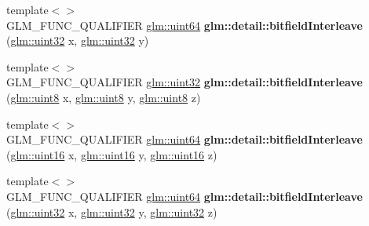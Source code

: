 \begin{DoxyCompactItemize}
\item 
\mbox{\label{bitfield_8inl_a7f40bc91b3d293fae0f7df8de85cdcc6}} 
{\footnotesize template$<$$>$ }\\G\+L\+M\+\_\+\+F\+U\+N\+C\+\_\+\+Q\+U\+A\+L\+I\+F\+I\+ER \hyperlink{group__gtc__type__precision_gae3632bf9b37da66233d78930dd06378a}{glm\+::uint64} {\bfseries glm\+::detail\+::bitfield\+Interleave} (\hyperlink{group__gtc__type__precision_ga202b6a53c105fcb7e531f9b443518451}{glm\+::uint32} x, \hyperlink{group__gtc__type__precision_ga202b6a53c105fcb7e531f9b443518451}{glm\+::uint32} y)
\item 
\mbox{\label{bitfield_8inl_a27e9c62ce3ad180236573daec6a6461f}} 
{\footnotesize template$<$$>$ }\\G\+L\+M\+\_\+\+F\+U\+N\+C\+\_\+\+Q\+U\+A\+L\+I\+F\+I\+ER \hyperlink{group__gtc__type__precision_ga202b6a53c105fcb7e531f9b443518451}{glm\+::uint32} {\bfseries glm\+::detail\+::bitfield\+Interleave} (\hyperlink{group__gtc__type__precision_ga1a7dcd8aac97cc8020817c94049deff2}{glm\+::uint8} x, \hyperlink{group__gtc__type__precision_ga1a7dcd8aac97cc8020817c94049deff2}{glm\+::uint8} y, \hyperlink{group__gtc__type__precision_ga1a7dcd8aac97cc8020817c94049deff2}{glm\+::uint8} z)
\item 
\mbox{\label{bitfield_8inl_aceed48a30e6dc4f2c64945a60369d73d}} 
{\footnotesize template$<$$>$ }\\G\+L\+M\+\_\+\+F\+U\+N\+C\+\_\+\+Q\+U\+A\+L\+I\+F\+I\+ER \hyperlink{group__gtc__type__precision_gae3632bf9b37da66233d78930dd06378a}{glm\+::uint64} {\bfseries glm\+::detail\+::bitfield\+Interleave} (\hyperlink{group__gtc__type__precision_gad8c2939e1fdd8e5828b31d95c52255d5}{glm\+::uint16} x, \hyperlink{group__gtc__type__precision_gad8c2939e1fdd8e5828b31d95c52255d5}{glm\+::uint16} y, \hyperlink{group__gtc__type__precision_gad8c2939e1fdd8e5828b31d95c52255d5}{glm\+::uint16} z)
\item 
\mbox{\label{bitfield_8inl_a7f6421e0b1180ec986fd91d8eb2d1cc9}} 
{\footnotesize template$<$$>$ }\\G\+L\+M\+\_\+\+F\+U\+N\+C\+\_\+\+Q\+U\+A\+L\+I\+F\+I\+ER \hyperlink{group__gtc__type__precision_gae3632bf9b37da66233d78930dd06378a}{glm\+::uint64} {\bfseries glm\+::detail\+::bitfield\+Interleave} (\hyperlink{group__gtc__type__precision_ga202b6a53c105fcb7e531f9b443518451}{glm\+::uint32} x, \hyperlink{group__gtc__type__precision_ga202b6a53c105fcb7e531f9b443518451}{glm\+::uint32} y, \hyperlink{group__gtc__type__precision_ga202b6a53c105fcb7e531f9b443518451}{glm\+::uint32} z)

\end{DoxyCompactItemize}
